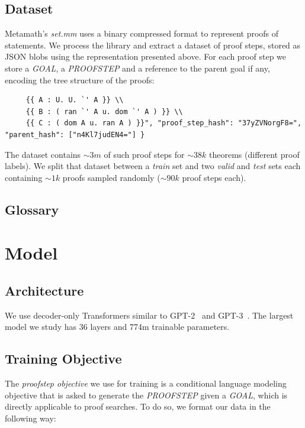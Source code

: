 \subsection{Dataset}

Metamath's \textit{set.mm} uses a binary compressed format to represent proofs of statements. We process the library and extract a dataset of proof steps, stored as JSON blobs using the representation presented above. For each proof step we store a \textit{GOAL}, a \textit{PROOFSTEP} and a reference to the parent goal if any, encoding the tree structure of the proofs:

\begin{verbatim}
     {{ A : U. U. `' A }} \\
     {{ B : ( ran `' A u. dom `' A ) }} \\
     {{ C : ( dom A u. ran A ) }}", "proof_step_hash": "37yZVNorgF8=", "parent_hash": ["n4Kl7judEN4="] }
\end{verbatim}

The dataset contains $\sim 3m$ of such proof steps for $\sim 38k$ theorems (different proof labels). We split that dataset between a \textit{train} set and two \textit{valid} and \textit{test} sets each containing $\sim 1k$ proofs sampled randomly ($\sim 90k$ proof steps each).

\subsection{Glossary}

\section{Model}

\subsection{Architecture}

We use decoder-only Transformers similar to GPT-2~\cite{radford2019language} and GPT-3~\cite{brown2020language}. The largest model we study has 36 layers and 774m trainable parameters.

\subsection{Training Objective}

The \textit{proofstep objective} we use for training is a conditional language modeling objective that is asked to generate the \textit{PROOFSTEP} given a \textit{GOAL}, which is directly applicable to proof searches. To do so, we format our data in the following way:

